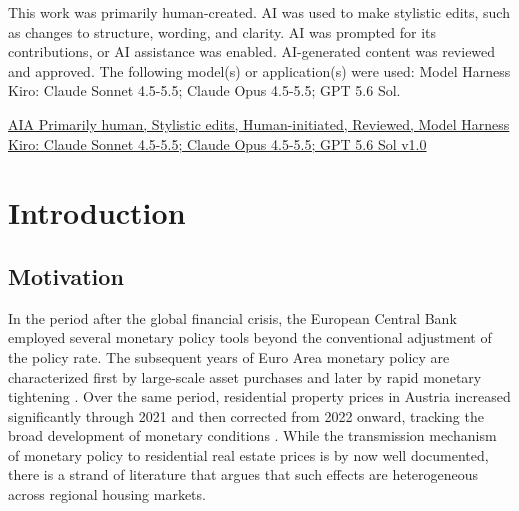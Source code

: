 \documentclass[a4paper,12pt, headsepline]{scrartcl}
\numberwithin{equation}{section}
\begin{document}
\vspace*{-17pt}
\noindent
This work was primarily human-created. AI was used to make stylistic edits, such as changes to structure, wording, and clarity. AI was prompted for its contributions, or AI assistance was enabled. AI-generated content was reviewed and approved. The following model(s) or application(s) were used: Model Harness Kiro: Claude Sonnet 4.5-5.5; Claude Opus 4.5-5.5; GPT 5.6 Sol.

\par\vspace{0.5em}
\noindent
\href{https://aiattribution.github.io/statements/AIA-Ph-Se-Hin-R-?model=Model%20Harness%20Kiro%3A%20Claude%20Sonnet%204.5%252D5.5%3B%20Claude%20Opus%204.5%252D5.5%3B%20GPT%205.6%20Sol-v1.0}{AIA Primarily human, Stylistic edits, Human-initiated, Reviewed, Model Harness Kiro: Claude Sonnet 4.5-5.5; Claude Opus 4.5-5.5; GPT 5.6 Sol v1.0}
\newpage
\tableofcontents %
\clearpage
\listoffigures
\clearpage
\listoftables
\clearpage
{} %

\section{Introduction}\label{sec:int}

\subsection{Motivation}\label{subsec:motivation}

In the period after the global financial crisis, the European Central Bank employed several monetary policy tools beyond the conventional adjustment of the policy rate. The subsequent years of Euro Area monetary policy are characterized first by large-scale asset purchases and later by rapid monetary tightening \citep{benigno2023}. Over the same period, residential property prices in Austria increased significantly through 2021 and then corrected from 2022 onward, tracking the broad development of monetary conditions \citep{belabed2022, hildebrandt2023}. While the transmission mechanism of monetary policy to residential real estate prices is by now well documented, there is a strand of literature that argues that such effects are heterogeneous across regional housing markets.
\end{document}
